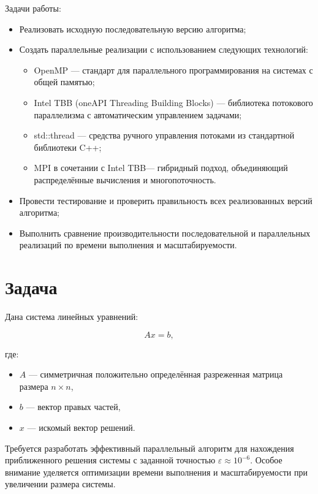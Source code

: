 \documentclass[12pt]{article}
\begin{document}
Задачи работы:

\begin{itemize}
\item Реализовать исходную последовательную версию алгоритма;
\item Создать параллельные реализации с использованием следующих технологий:
\begin{itemize}
\item OpenMP — стандарт для параллельного программирования на системах с общей памятью;
\item Intel TBB (oneAPI Threading Building Blocks) — библиотека потокового параллелизма с автоматическим управлением задачами;
\item std::thread — средства ручного управления потоками из стандартной библиотеки C++;
\item MPI в сочетании с  Intel TBB— гибридный подход, объединяющий распределённые вычисления и многопоточность.
\end{itemize}
\item Провести тестирование и проверить правильность всех реализованных версий алгоритма;
\item Выполнить сравнение производительности последовательной и параллельных реализаций по времени выполнения и масштабируемости.
\end{itemize}

\section{Задача}

Дана система линейных уравнений:

\begin{equation}
A x = b,
\end{equation}

где:

\begin{itemize}
    \item $A$ — симметричная положительно определённая разреженная матрица размера $n \times n$,
    \item $b$ — вектор правых частей,
    \item $x$ — искомый вектор решений.
\end{itemize}

Требуется разработать эффективный параллельный алгоритм для нахождения приближенного решения системы с заданной точностью $\varepsilon \approx 10^{-6}$. Особое внимание уделяется оптимизации времени выполнения и масштабируемости при увеличении размера системы.
\end{document}

